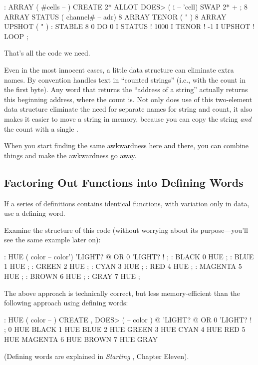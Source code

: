 \begin{Code}
: ARRAY  ( #cells -- )  CREATE  2* ALLOT
   DOES> ( i -- 'cell)  SWAP  2* + ; 
8 ARRAY STATUS  ( channel# -- adr)
8 ARRAY TENOR   (        "       )
8 ARRAY UPSHOT  (        "       )
: STABLE   8 0 DO  0 I STATUS !  1000 I TENOR ! 
   -1 I UPSHOT !  LOOP ;
\end{Code}
That's all the code we need.

Even in the most innocent cases, a little data structure can eliminate
extra names. By convention \Forth{} handles text in ``counted
strings'' (i.e., with the count in the first byte). Any word that
returns the ``address of a string'' actually returns this beginning
address, where the count is. Not only does use of this two-element
data structure eliminate the need for separate names for string and
count, it also makes it easier to move a string in memory, because you
can copy the string \emph{and} the count with a single .

When you start finding the same awkwardness here and there, you can
combine things and make the awkwardness go away.
%

\subsection{Factoring Out Functions into Defining Words}

\begin{tip}
If a series of definitions contains identical functions, with
variation only in data, use a defining word.
\end{tip}
Examine the structure of this code (without worrying about its
purpose---you'll see the same example later on):

\begin{Code}
: HUE  ( color -- color') 
   'LIGHT? @  OR  0 'LIGHT? ! ;
: BLACK   0 HUE ;
: BLUE   1 HUE ;
: GREEN   2 HUE ;
: CYAN   3 HUE ;
: RED   4 HUE ;
: MAGENTA   5 HUE ;
: BROWN   6 HUE ;
: GRAY   7 HUE ;
\end{Code}

\noindent The above approach is technically correct, but less
memory-efficient than the following approach using defining words:

\begin{Code}
: HUE   ( color -- )  CREATE ,
   DOES>  ( -- color )  @ 'LIGHT? @  OR  0 'LIGHT? ! ;
 0 HUE BLACK         1 HUE BLUE          2 HUE GREEN
 3 HUE CYAN          4 HUE RED           5 HUE MAGENTA
 6 HUE BROWN         7 HUE GRAY
\end{Code}
(Defining words are explained in \emph{Starting \Forth{}}, Chapter Eleven).

